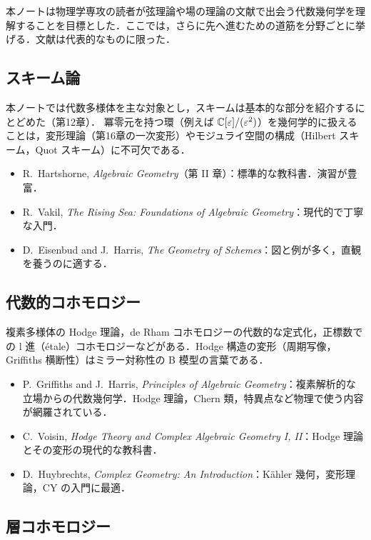 本ノートは物理学専攻の読者が弦理論や場の理論の文献で出会う代数幾何学を理解することを目標とした．ここでは，さらに先へ進むための道筋を分野ごとに挙げる．文献は代表的なものに限った．

\subsection{スキーム論}

本ノートでは代数多様体を主な対象とし，スキームは基本的な部分を紹介するにとどめた（第12章）．
冪零元を持つ環（例えば $\mathbb{C}[\varepsilon]/(\varepsilon^2)$）を幾何学的に扱えることは，変形理論（第16章の一次変形）やモジュライ空間の構成（Hilbert スキーム，Quot スキーム）に不可欠である．
\begin{itemize}
\item R.~Hartshorne, \textit{Algebraic Geometry}（第 II 章）：標準的な教科書．演習が豊富．
\item R.~Vakil, \textit{The Rising Sea: Foundations of Algebraic Geometry}：現代的で丁寧な入門．
\item D.~Eisenbud and J.~Harris, \textit{The Geometry of Schemes}：図と例が多く，直観を養うのに適する．
\end{itemize}

\subsection{代数的コホモロジー}

複素多様体の Hodge 理論，de Rham コホモロジーの代数的な定式化，正標数での l 進（\'etale）コホモロジーなどがある．Hodge 構造の変形（周期写像，Griffiths 横断性）はミラー対称性の B 模型の言葉である．
\begin{itemize}
\item P.~Griffiths and J.~Harris, \textit{Principles of Algebraic Geometry}：複素解析的な立場からの代数幾何学．Hodge 理論，Chern 類，特異点など物理で使う内容が網羅されている．
\item C.~Voisin, \textit{Hodge Theory and Complex Algebraic Geometry I, II}：Hodge 理論とその変形の現代的な教科書．
\item D.~Huybrechts, \textit{Complex Geometry: An Introduction}：K\"ahler 幾何，変形理論，CY の入門に最適．
\end{itemize}

\subsection{層コホモロジー}

